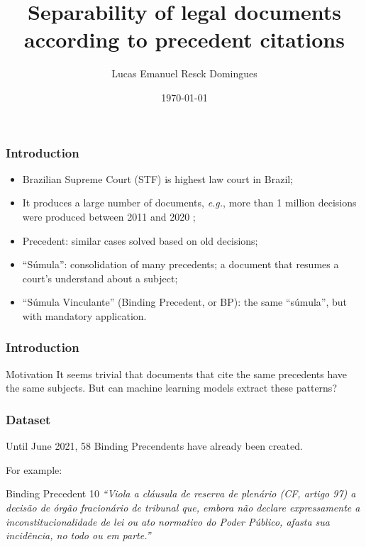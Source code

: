 \documentclass{beamer}
\title{Separability of legal documents according to precedent citations}
\author{Lucas Emanuel Resck Domingues}
\institute[FGV-EMAp]{School of Applied Mathematics \\
Getulio Vargas Foundation}
\date{\today}
\newcommand{\eg}{\textit{e.g.}}
\begin{document}
    \frame{\titlepage}

    \begin{frame}
        \frametitle{Introduction}
        \begin{itemize}
            \item Brazilian Supreme Court (STF) is highest law court in Brazil; \pause
            \item It produces a large number of documents, \eg, more than 1 million decisions were produced between 2011 and 2020 \cite{stf}; \pause
            \item Precedent: similar cases solved based on old decisions;\pause
            \item ``Súmula'': consolidation of many precedents; a document that resumes a court's understand about a subject;\pause
            \item ``Súmula Vinculante'' (Binding Precedent, or BP): the same ``súmula'', but with mandatory application.
        \end{itemize}
    \end{frame}

    \begin{frame}
        \frametitle{Introduction}
        \begin{block}{Motivation}
            It seems trivial that documents that cite the same precedents have the same subjects. \pause 
            But can machine learning models extract these patterns?            
        \end{block}
    \end{frame}

    \begin{frame}
        \frametitle{Dataset}
        Until June 2021, 58 Binding Precendents have already been created. \pause

        For example:
        \begin{block}{Binding Precedent 10}
            \textit{``Viola a cláusula de reserva de plenário (CF, artigo 97) a decisão de órgão fracionário de tribunal que, embora não declare expressamente a inconstitucionalidade de lei ou ato normativo do Poder Público, afasta sua incidência, no todo ou em parte.''}
        \end{block}
    \end{frame}
\end{document}
